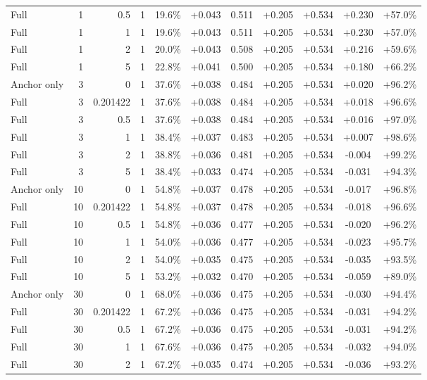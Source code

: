 \begin{table}[htbp]
\begin{tabular}{lrrrccccccc}
Full & 1 & 0.5 & 1 & 19.6\% & +0.043 & 0.511 & +0.205 & +0.534 & +0.230 & +57.0\% \\
Full & 1 & 1 & 1 & 19.6\% & +0.043 & 0.511 & +0.205 & +0.534 & +0.230 & +57.0\% \\
Full & 1 & 2 & 1 & 20.0\% & +0.043 & 0.508 & +0.205 & +0.534 & +0.216 & +59.6\% \\
Full & 1 & 5 & 1 & 22.8\% & +0.041 & 0.500 & +0.205 & +0.534 & +0.180 & +66.2\% \\
Anchor only & 3 & 0 & 1 & 37.6\% & +0.038 & 0.484 & +0.205 & +0.534 & +0.020 & +96.2\% \\
Full & 3 & 0.201422 & 1 & 37.6\% & +0.038 & 0.484 & +0.205 & +0.534 & +0.018 & +96.6\% \\
Full & 3 & 0.5 & 1 & 37.6\% & +0.038 & 0.484 & +0.205 & +0.534 & +0.016 & +97.0\% \\
Full & 3 & 1 & 1 & 38.4\% & +0.037 & 0.483 & +0.205 & +0.534 & +0.007 & +98.6\% \\
Full & 3 & 2 & 1 & 38.8\% & +0.036 & 0.481 & +0.205 & +0.534 & -0.004 & +99.2\% \\
Full & 3 & 5 & 1 & 38.4\% & +0.033 & 0.474 & +0.205 & +0.534 & -0.031 & +94.3\% \\
Anchor only & 10 & 0 & 1 & 54.8\% & +0.037 & 0.478 & +0.205 & +0.534 & -0.017 & +96.8\% \\
Full & 10 & 0.201422 & 1 & 54.8\% & +0.037 & 0.478 & +0.205 & +0.534 & -0.018 & +96.6\% \\
Full & 10 & 0.5 & 1 & 54.8\% & +0.036 & 0.477 & +0.205 & +0.534 & -0.020 & +96.2\% \\
Full & 10 & 1 & 1 & 54.0\% & +0.036 & 0.477 & +0.205 & +0.534 & -0.023 & +95.7\% \\
Full & 10 & 2 & 1 & 54.0\% & +0.035 & 0.475 & +0.205 & +0.534 & -0.035 & +93.5\% \\
Full & 10 & 5 & 1 & 53.2\% & +0.032 & 0.470 & +0.205 & +0.534 & -0.059 & +89.0\% \\
Anchor only & 30 & 0 & 1 & 68.0\% & +0.036 & 0.475 & +0.205 & +0.534 & -0.030 & +94.4\% \\
Full & 30 & 0.201422 & 1 & 67.2\% & +0.036 & 0.475 & +0.205 & +0.534 & -0.031 & +94.2\% \\
Full & 30 & 0.5 & 1 & 67.2\% & +0.036 & 0.475 & +0.205 & +0.534 & -0.031 & +94.2\% \\
Full & 30 & 1 & 1 & 67.6\% & +0.036 & 0.475 & +0.205 & +0.534 & -0.032 & +94.0\% \\
Full & 30 & 2 & 1 & 67.2\% & +0.035 & 0.474 & +0.205 & +0.534 & -0.036 & +93.2\% \\

\end{tabular}
\end{table}
